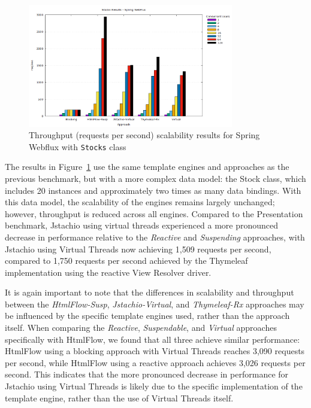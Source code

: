 \begin{figure}[h]
     \centering
     \includegraphics[width=0.8\textwidth]{./Graphs/stocks-webflux-jmeter.png}
     \caption{Throughput (requests per second) scalability results for Spring Webflux with \texttt{Stocks} class}\label{fig:stocks-webflux-jmeter}
\end{figure}

The results in Figure~\ref{fig:stocks-webflux-jmeter} use the same template
engines and approaches as the previous benchmark, but with a more complex data
model: the Stock class, which includes 20 instances and approximately two times
as many data bindings. With this data model, the scalability of the engines
remains largely unchanged; however, throughput is reduced across all engines.
Compared to the Presentation benchmark, Jstachio using virtual threads
experienced a more pronounced decrease in performance relative to the
\textit{Reactive} and \textit{Suspending} approaches, with Jstachio using
Virtual Threads now achieving 1,509 requests per second, compared to 1,750
requests per second achieved by the Thymeleaf implementation using the reactive
View Resolver driver.

It is again important to note that the differences in scalability and
throughput between the \textit{HtmlFlow-Susp}, \textit{Jstachio-Virtual}, and
\textit{Thymeleaf-Rx} approaches may be influenced by the specific template
engines used, rather than the approach itself. When comparing the
\textit{Reactive}, \textit{Suspendable}, and \textit{Virtual} approaches
specifically with HtmlFlow, we found that all three achieve similar
performance: HtmlFlow using a blocking approach with Virtual Threads reaches
3,090 requests per second, while HtmlFlow using a reactive approach achieves
3,026 requests per second. This indicates that the more pronounced decrease in
performance for Jstachio using Virtual Threads is likely due to the specific
implementation of the template engine, rather than the use of Virtual Threads
itself.

